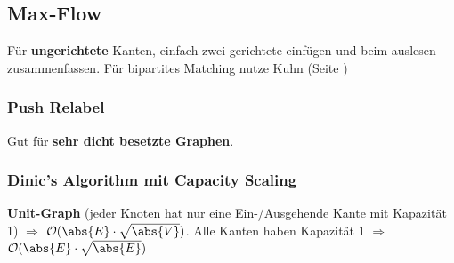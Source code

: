 \subsection{Max-Flow}
Für \textbf{ungerichtete} Kanten, einfach zwei gerichtete einfügen und beim auslesen zusammenfassen.
Für bipartites Matching nutze Kuhn (Seite \pageref{kuhn})


\subsubsection{Push Relabel}
Gut für \textbf{sehr dicht besetzte Graphen}.\newline
\begin{methods}
\end{methods}

\subsubsection{Dinic's Algorithm mit Capacity Scaling}
\begin{methods}
\end{methods}
\textbf{Unit-Graph} (jeder Knoten hat nur eine Ein-/Ausgehende Kante mit Kapazität 1)
$\Rightarrow$ $\O(\abs{E}\cdot\sqrt{\abs{V}})$.
Alle Kanten haben Kapazität 1 $\Rightarrow$ $\O(\abs{E}\cdot\sqrt{\abs{E}})$

